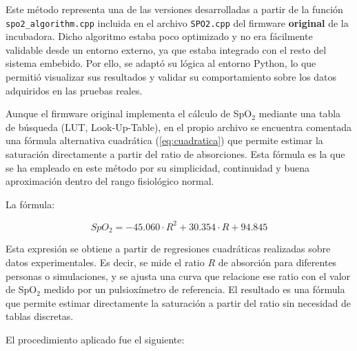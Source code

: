 Este método representa una de las versiones desarrolladas a partir de la función \texttt{spo2\_algorithm.cpp} incluida en el archivo \texttt{SPO2.cpp} del firmware \textbf{original} de la incubadora. Dicho algoritmo estaba poco optimizado y no era fácilmente validable desde un entorno externo, ya que estaba integrado con el resto del sistema embebido. Por ello, se adaptó su lógica al entorno Python, lo que permitió visualizar sus resultados y validar su comportamiento sobre los datos adquiridos en las pruebas reales.

Aunque el firmware original implementa el cálculo de SpO$_2$ mediante una tabla de búsqueda (LUT, Look-Up-Table), en el propio archivo se encuentra comentada una fórmula alternativa cuadrática (\ref{eq:cuadratica}) que permite estimar la saturación directamente a partir del ratio de absorciones. Esta fórmula es la que se ha empleado en este método por su simplicidad, continuidad y buena aproximación dentro del rango fisiológico normal.

La fórmula:

\begin{equation}
SpO_2 = -45.060 \cdot R^2 + 30.354 \cdot R + 94.845
\label{eq:cuadratica}
\end{equation}

Esta expresión se obtiene a partir de regresiones cuadráticas realizadas sobre datos experimentales. Es decir, se mide el ratio \( R \) de absorción para diferentes personas o simulaciones, y se ajusta una curva que relacione ese ratio con el valor de SpO$_2$ medido por un pulsioxímetro de referencia. El resultado es una fórmula que permite estimar directamente la saturación a partir del ratio sin necesidad de tablas discretas.

El procedimiento aplicado fue el siguiente:

